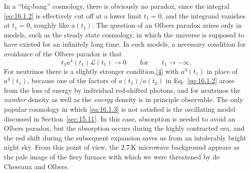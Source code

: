 In a ``big-bang'' cosmology, there is obviously no paradox, since the integral
\eqref{eq:16.1.2} is effectively cut off at a lower limit \(t_1=0\), and the
integrand vanishes at \(t_1=0\), roughly like \(a(t_1)\). The question of an
Olbers paradox arises only in models, such as the steady state cosmology, in
which the universe is supposed to have existed for an infinitely long time. In
such models, a necessary condition for avoidance of the Olbers paradox is that
\begin{equation}
  t_1a^4(t_1)\mathscr L(t_1)\longrightarrow0
  \qquad\text{for}\qquad
  t_1\longrightarrow-\infty.
  \tag{16.1.3}\label{eq:16.1.3}
\end{equation}
For neutrinos there is a slightly stronger
condition,\hyperref[ch16-ref-4]{[4]} with \(a^3(t_1)\) in place of
\(a^4(t_1)\), because one of the factors of \(a(t_1)/a(t_0)\) in
Eq.~\eqref{eq:16.1.2} arose from the loss of energy by individual red-shifted
photons, and for neutrinos the \emph{number} density as well as the
\emph{energy} density is in principle observable. The only popular cosmology
in which \eqref{eq:16.1.3} is not satisfied is the oscillating model discussed
in Section~\ref{sec:15.11}. In this case, absorption is needed to avoid an
Olbers paradox, but the absorption occurs during the highly contracted era, and
the red shift during the subsequent expansion saves us from an intolerably
bright night sky. From this point of view, the \(2.7\,\mathrm K\) microwave
background appears as the pale image of the fiery furnace with which we were
threatened by de Cheseaux and Olbers.
